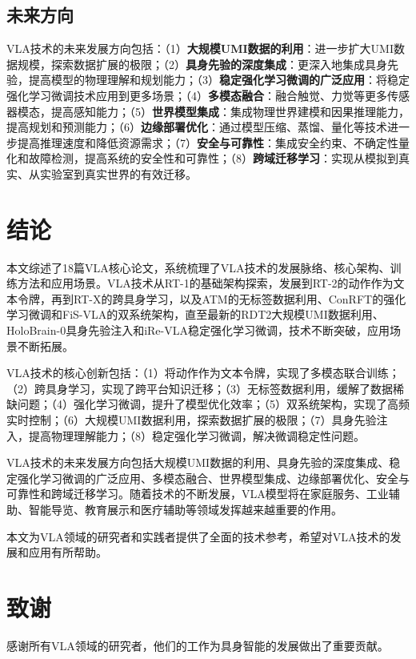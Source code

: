 \documentclass[12pt,a4paper]{article}
\begin{document}
\subsection{未来方向}

VLA技术的未来发展方向包括：（1）\textbf{大规模UMI数据的利用}：进一步扩大UMI数据规模，探索数据扩展的极限；（2）\textbf{具身先验的深度集成}：更深入地集成具身先验，提高模型的物理理解和规划能力；（3）\textbf{稳定强化学习微调的广泛应用}：将稳定强化学习微调技术应用到更多场景；（4）\textbf{多模态融合}：融合触觉、力觉等更多传感器模态，提高感知能力；（5）\textbf{世界模型集成}：集成物理世界建模和因果推理能力，提高规划和预测能力；（6）\textbf{边缘部署优化}：通过模型压缩、蒸馏、量化等技术进一步提高推理速度和降低资源需求；（7）\textbf{安全与可靠性}：集成安全约束、不确定性量化和故障检测，提高系统的安全性和可靠性；（8）\textbf{跨域迁移学习}：实现从模拟到真实、从实验室到真实世界的有效迁移。

\section{结论}

本文综述了18篇VLA核心论文，系统梳理了VLA技术的发展脉络、核心架构、训练方法和应用场景。VLA技术从RT-1的基础架构探索，发展到RT-2的动作作为文本令牌，再到RT-X的跨具身学习，以及ATM的无标签数据利用、ConRFT的强化学习微调和FiS-VLA的双系统架构，直至最新的RDT2大规模UMI数据利用、HoloBrain-0具身先验注入和iRe-VLA稳定强化学习微调，技术不断突破，应用场景不断拓展。

VLA技术的核心创新包括：（1）将动作作为文本令牌，实现了多模态联合训练；（2）跨具身学习，实现了跨平台知识迁移；（3）无标签数据利用，缓解了数据稀缺问题；（4）强化学习微调，提升了模型优化效率；（5）双系统架构，实现了高频实时控制；（6）大规模UMI数据利用，探索数据扩展的极限；（7）具身先验注入，提高物理理解能力；（8）稳定强化学习微调，解决微调稳定性问题。

VLA技术的未来发展方向包括大规模UMI数据的利用、具身先验的深度集成、稳定强化学习微调的广泛应用、多模态融合、世界模型集成、边缘部署优化、安全与可靠性和跨域迁移学习。随着技术的不断发展，VLA模型将在家庭服务、工业辅助、智能导览、教育展示和医疗辅助等领域发挥越来越重要的作用。

本文为VLA领域的研究者和实践者提供了全面的技术参考，希望对VLA技术的发展和应用有所帮助。

\section*{致谢}

感谢所有VLA领域的研究者，他们的工作为具身智能的发展做出了重要贡献。



\end{document}
